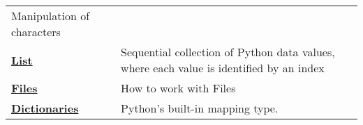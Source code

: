 \documentclass[11pt]{article}
\begin{document}
\begin{longtable}[]{@{}ll@{}}
\begin{minipage}[t]{0.29\columnwidth}
Manipulation of characters\strut
\end{minipage}\tabularnewline
\begin{minipage}[t]{0.29\columnwidth}\raggedright\strut
\textbf{\href{http://interactivepython.org/runestone/static/thinkcspy/Lists/toctree.html}{List}}\strut
\end{minipage} & \begin{minipage}[t]{0.29\columnwidth}\raggedright\strut
Sequential collection of Python data values, where each value is
identified by an index\strut
\end{minipage}\tabularnewline
\begin{minipage}[t]{0.29\columnwidth}\raggedright\strut
\textbf{\href{http://interactivepython.org/runestone/static/thinkcspy/Files/toctree.html}{Files}}\strut
\end{minipage} & \begin{minipage}[t]{0.29\columnwidth}\raggedright\strut
How to work with Files\strut
\end{minipage}\tabularnewline
\begin{minipage}[t]{0.29\columnwidth}\raggedright\strut
\textbf{\href{http://interactivepython.org/runestone/static/thinkcspy/Dictionaries/toctree.html}{Dictionaries}}\strut
\end{minipage} & \begin{minipage}[t]{0.29\columnwidth}\raggedright\strut
Python's built-in mapping type.\strut
\end{minipage}\tabularnewline
\bottomrule
\end{longtable}


    
    
    
    
\end{document}
